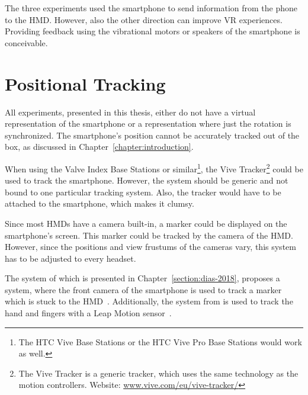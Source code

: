 The three experiments used the smartphone to send information from the phone to the \ac{HMD}. However, also the other direction can improve \ac{VR} experiences. Providing feedback using the vibrational motors or speakers of the smartphone is conceivable.


\section{Positional Tracking}\label{section:fw-positional-tracking}

All experiments, presented in this thesis, either do not have a virtual representation of the smartphone or a representation where just the rotation is synchronized. The smartphone's position cannot be accurately tracked out of the box, as discussed in Chapter~\ref{chapter:introduction}.

When using the Valve Index Base Stations or similar\footnote{The HTC Vive Base Stations or the HTC Vive Pro Base Stations would work as well.}, the Vive Tracker\footnote{The Vive Tracker is a generic tracker, which uses the same technology as the motion controllers. Website: \href{https://www.vive.com/eu/vive-tracker/}{www.vive.com/eu/vive-tracker/}} could be used to track the smartphone. However, the system should be generic and not bound to one particular tracking system. Also, the tracker would have to be attached to the smartphone, which makes it clumsy.

Since most \acp{HMD} have a camera built-in, a marker could be displayed on the smartphone's screen. This marker could be tracked by the camera of the \ac{HMD}. However, since the positions and view frustums of the cameras vary, this system has to be adjusted to every headset.

The system of \citeauthor{Dias.2018} which is presented in Chapter~\ref{section:dias-2018}, proposes a system, where the front camera of the smartphone is used to track a marker which is stuck to the \ac{HMD}~\cite[4]{Dias.2018}. Additionally, the system from \citeauthor{Afonso.2017} is used to track the hand and fingers with a Leap Motion sensor~\cite[247]{Afonso.2017}.

